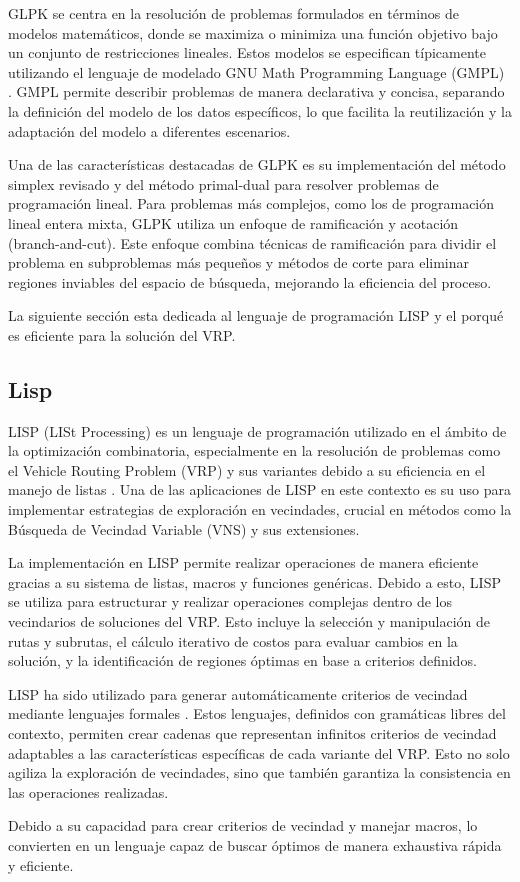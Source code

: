 \documentclass{article}
\begin{document}
GLPK se centra en la resolución de problemas formulados en términos de modelos matemáticos, donde se maximiza o minimiza una función objetivo bajo un conjunto de restricciones lineales. Estos modelos se especifican típicamente utilizando el lenguaje de modelado GNU Math Programming Language (GMPL) \cite{ref20}. GMPL permite describir problemas de manera declarativa y concisa, separando la definición del modelo de los datos específicos, lo que facilita la reutilización y la adaptación del modelo a diferentes escenarios.

Una de las características destacadas de GLPK es su implementación del método simplex revisado y del método primal-dual para resolver problemas de programación lineal. Para problemas más complejos, como los de programación lineal entera mixta, GLPK utiliza un enfoque de ramificación y acotación (branch-and-cut). Este enfoque combina técnicas de ramificación para dividir el problema en subproblemas más pequeños y métodos de corte para eliminar regiones inviables del espacio de búsqueda, mejorando la eficiencia del proceso.

La siguiente sección esta dedicada al lenguaje de programación LISP y el porqué es eficiente para la solución del VRP.

\subsection{Lisp}
 LISP (LISt Processing) es un lenguaje de programación utilizado en el ámbito de la optimización combinatoria, especialmente en la resolución de problemas como el Vehicle Routing Problem (VRP) y sus variantes debido a su eficiencia en el manejo de listas \cite{ref1,ref2,ref3,ref4,ref16}. Una de las aplicaciones de LISP en este contexto es su uso para implementar estrategias de exploración en vecindades, crucial en métodos como la Búsqueda de Vecindad Variable (VNS) y sus extensiones.

La implementación en LISP permite realizar operaciones de manera eficiente gracias a su sistema de listas, macros y funciones genéricas. Debido a esto, LISP se utiliza para estructurar y realizar operaciones complejas dentro de los vecindarios de soluciones del VRP. Esto incluye la selección y manipulación de rutas y subrutas, el cálculo iterativo de costos para evaluar cambios en la solución, y la identificación de regiones óptimas en base a criterios definidos. 

LISP ha sido utilizado para generar automáticamente criterios de vecindad mediante lenguajes formales \cite{ref16}. Estos lenguajes, definidos con gramáticas libres del contexto, permiten crear cadenas que representan infinitos criterios de vecindad adaptables a las características específicas de cada variante del VRP. Esto no solo agiliza la exploración de vecindades, sino que también garantiza la consistencia en las operaciones realizadas. 

Debido a su capacidad para crear criterios de vecindad y manejar macros, lo convierten en un lenguaje capaz de buscar óptimos de manera exhaustiva rápida y eficiente.


 
\end{document}
